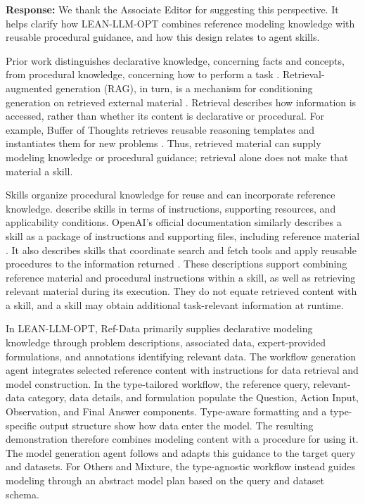 {\color{blue}
\noindent\textbf{Response:}
We thank the Associate Editor for suggesting this perspective. It helps clarify how LEAN-LLM-OPT combines reference modeling knowledge with reusable procedural guidance, and how this design relates to agent skills.

Prior work distinguishes declarative knowledge, concerning facts and concepts, from procedural knowledge, concerning how to perform a task \citep{ae1_li2024metacognitive}. Retrieval-augmented generation (RAG), in turn, is a mechanism for conditioning generation on retrieved external material \citep{ae1_lewis2020rag}. Retrieval describes how information is accessed, rather than whether its content is declarative or procedural. For example, Buffer of Thoughts retrieves reusable reasoning templates and instantiates them for new problems \citep{ae1_yang2024buffer}. Thus, retrieved material can supply modeling knowledge or procedural guidance; retrieval alone does not make that material a skill.

Skills organize procedural knowledge for reuse and can incorporate reference knowledge. \citet{ae1_zhou2026skillsurvey} describe skills in terms of instructions, supporting resources, and applicability conditions. OpenAI's official documentation similarly describes a skill as a package of instructions and supporting files, including reference material \citep{ae1_openai2026skills}. It also describes skills that coordinate search and fetch tools and apply reusable procedures to the information returned \citep{ae1_openai2026skilltools}. These descriptions support combining reference material and procedural instructions within a skill, as well as retrieving relevant material during its execution. They do not equate retrieved content with a skill, and a skill may obtain additional task-relevant information at runtime.

In LEAN-LLM-OPT, Ref-Data primarily supplies declarative modeling knowledge through problem descriptions, associated data, expert-provided formulations, and annotations identifying relevant data. The workflow generation agent integrates selected reference content with instructions for data retrieval and model construction. In the type-tailored workflow, the reference query, relevant-data category, data details, and formulation populate the Question, Action Input, Observation, and Final Answer components. Type-aware formatting and a type-specific output structure show how data enter the model. The resulting demonstration therefore combines modeling content with a procedure for using it. The model generation agent follows and adapts this guidance to the target query and datasets. For Others and Mixture, the type-agnostic workflow instead guides modeling through an abstract model plan based on the query and dataset schema.

}

